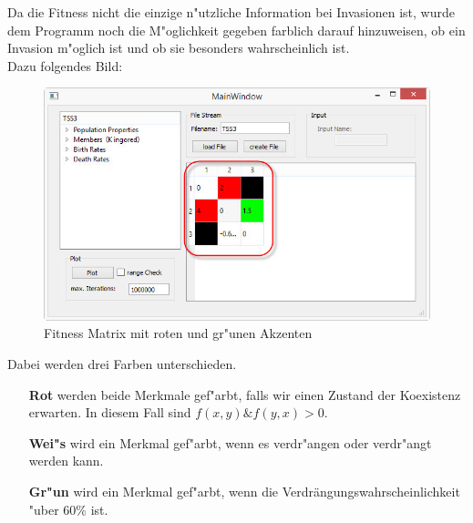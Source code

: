 \documentclass[11pt, a4paper, german]{article}
\theoremstyle{plain}
\begin{document}
	Da die Fitness nicht die einzige n"utzliche Information bei Invasionen ist, wurde dem Programm noch die M"oglichkeit gegeben farblich darauf hinzuweisen, ob ein Invasion m"oglich ist und ob sie besonders wahrscheinlich ist.\\
	Dazu folgendes Bild:
	\begin{figure}[H]
		\centering
		\includegraphics[width=1\linewidth]{./Pictures/MainWindow_red_green_loaded}
		\caption[MainWindow_redGreenFitness]{Fitness Matrix mit roten und gr"unen Akzenten}
		\label{fig:MainWindow_red_green_loaded}
	\end{figure}
	Dabei werden drei Farben unterschieden. 
	\begin{itemize}
		\item [\textbf{Rot}] werden beide Merkmale gef"arbt, falls wir einen Zustand der Koexistenz erwarten. In diesem Fall sind $ f(x,y) \& f(y,x) > 0 $.
		\item [\textbf{Wei"s}] wird ein Merkmal gef"arbt, wenn es verdr"angen oder verdr"angt werden kann.
		\item [\textbf{Gr"un}] wird ein Merkmal gef"arbt, wenn die Verdrängungswahrscheinlichkeit "uber 60\% ist.
	\end{itemize}
\end{document}
